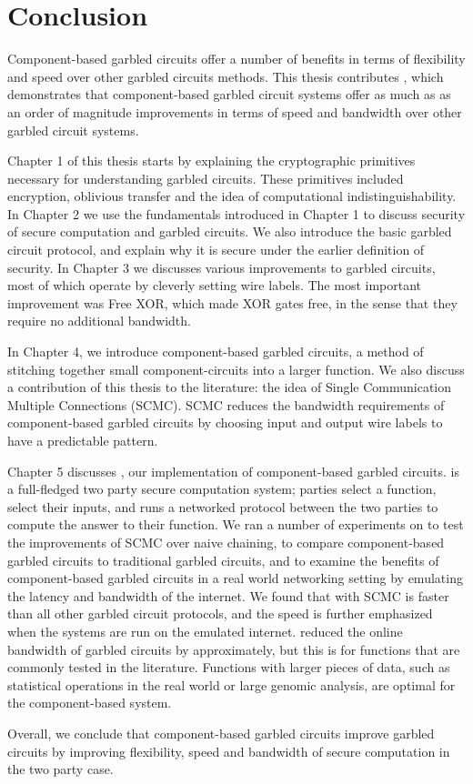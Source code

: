 
\chapter*{Conclusion}
	\setcounter{chapter}{4}
	\setcounter{section}{0}
	
Component-based garbled circuits offer a number of benefits in terms of flexibility and speed over other garbled circuits methods.
This thesis contributes \CompGC, which demonstrates that component-based garbled circuit systems offer as much as as an order of magnitude improvements in terms of speed and bandwidth over other garbled circuit systems.

Chapter 1 of this thesis starts by explaining the cryptographic primitives necessary for understanding garbled circuits.
These primitives included encryption, oblivious transfer and the idea of computational indistinguishability.
In Chapter 2 we use the fundamentals introduced in Chapter 1 to discuss security of secure computation and garbled circuits.
We also introduce the basic garbled circuit protocol, and explain why it is secure under the earlier definition of security.
In Chapter 3 we discusses various improvements to garbled circuits, most of which operate by cleverly setting wire labels.
The most important improvement was Free XOR, which made XOR gates free, in the sense that they require no additional bandwidth.

In Chapter 4, we introduce component-based garbled circuits, a method of stitching together small component-circuits into a larger function.
We also discuss a contribution of this thesis to the literature: the idea of Single Communication Multiple Connections (SCMC).
SCMC reduces the bandwidth requirements of component-based garbled circuits by choosing input and output wire labels to have a predictable pattern.

Chapter 5 discusses \CompGC, our implementation of component-based garbled circuits.
\CompGC is a full-fledged two party secure computation system; parties select a function, select their inputs, and \CompGC runs a networked protocol between the two parties to compute the answer to their function.
We ran a number of experiments on \CompGC to test the improvements of SCMC over naive chaining, to compare component-based garbled circuits to traditional garbled circuits, and to examine the benefits of component-based garbled circuits in a real world networking setting by emulating the latency and bandwidth of the internet.
We found that \CompGC with SCMC is faster than all other garbled circuit protocols, and the speed is further emphasized when the systems are run on the emulated internet.
\CompGC reduced the online bandwidth of garbled circuits by approximately, but this is for functions that are commonly tested in the literature.
Functions with larger pieces of data, such as statistical operations in the real world or large genomic analysis, are optimal for the component-based system.

Overall, we conclude that component-based garbled circuits improve garbled circuits by improving flexibility, speed and bandwidth of secure computation in the two party case.

